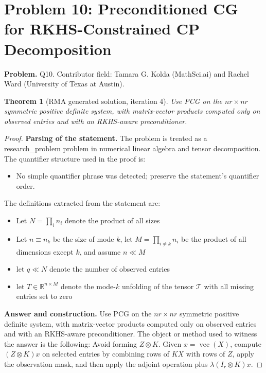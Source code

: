 \documentclass[11pt]{article}
\newtheorem{theorem}{Theorem}
\begin{document}
\section*{Problem 10: Preconditioned CG for RKHS-Constrained CP Decomposition}

\noindent\textbf{Problem.} Q10. Contributor field: Tamara G. Kolda (MathSci.ai) and Rachel Ward (University of Texas at Austin).

\begin{theorem}[RMA generated solution, iteration 4]
Use PCG on the \(nr\times nr\) symmetric positive definite system, with matrix-vector products computed only on observed entries and with an RKHS-aware preconditioner.
\end{theorem}

\begin{proof}
\textbf{Parsing of the statement.}
The problem is treated as a research_problem problem in numerical linear algebra and tensor decomposition.
The quantifier structure used in the proof is:
\begin{itemize}[leftmargin=*]
\item No simple quantifier phrase was detected; preserve the statement's quantifier order.
\end{itemize}
The definitions extracted from the statement are:
\begin{itemize}[leftmargin=*]
\item Let $N = \prod_i n_i$ denote the product of all sizes
\item Let $n \equiv n_k$ be the size of mode $k$, let $M = \prod_{i\neq k} n_i$ be the product of all dimensions except $k$, and assume $n \ll M$
\item let $q \ll N$ denote the number of observed entries
\item let $T \in \mathbb{R}^{n \times M}$ denote the mode-$k$ unfolding of the tensor $\mathcal{T}$ with all missing entries set to zero
\end{itemize}

\textbf{Answer and construction.}
Use PCG on the \(nr\times nr\) symmetric positive definite system, with matrix-vector products computed only on observed entries and with an RKHS-aware preconditioner. The object or method used to witness the answer is the
following: Avoid forming \(Z\otimes K\). Given \(x=\operatorname{vec}(X)\), compute \((Z\otimes K)x\) on selected entries by combining rows of \(KX\) with rows of \(Z\), apply the observation mask, and then apply the adjoint operation plus \(\lambda(I_r\otimes K)x\).


\end{proof}
\end{document}
